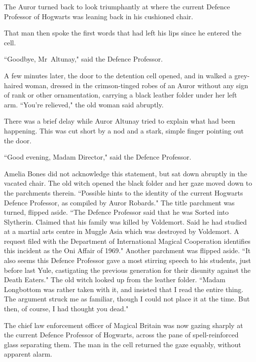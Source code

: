 The Auror turned back to look triumphantly at where the current Defence Professor of Hogwarts was leaning back in his cushioned chair.

That man then spoke the first words that had left his lips since he entered the cell.

``Goodbye, Mr~Altunay," said the Defence Professor.

A few minutes later, the door to the detention cell opened, and in walked a grey-haired woman, dressed in the crimson-tinged robes of an Auror without any sign of rank or other ornamentation, carrying a black leather folder under her left arm. ``You're relieved," the old woman said abruptly.

There was a brief delay while Auror Altunay tried to explain what had been happening. This was cut short by a nod and a stark, simple finger pointing out the door.

``Good evening, Madam Director," said the Defence Professor.

Amelia Bones did not acknowledge this statement, but sat down abruptly in the vacated chair. The old witch opened the black folder and her gaze moved down to the parchments therein. ``Possible hints to the identity of the current Hogwarts Defence Professor, as compiled by Auror Robards." The title parchment was turned, flipped aside. ``The Defence Professor said that he was Sorted into Slytherin. Claimed that his family was killed by Voldemort. Said he had studied at a martial arts centre in Muggle Asia which was destroyed by Voldemort. A request filed with the Department of International Magical Cooperation identifies this incident as the Oni Affair of 1969." Another parchment was flipped aside. ``It also seems this Defence Professor gave a most stirring speech to his students, just before last Yule, castigating the previous generation for their disunity against the Death Eaters." The old witch looked up from the leather folder. ``Madam Longbottom was rather taken with it, and insisted that I read the entire thing. The argument struck me as familiar, though I could not place it at the time. But then, of course, I had thought you dead."

The chief law enforcement officer of Magical Britain was now gazing sharply at the current Defence Professor of Hogwarts, across the pane of spell-reinforced glass separating them. The man in the cell returned the gaze equably, without apparent alarm.

